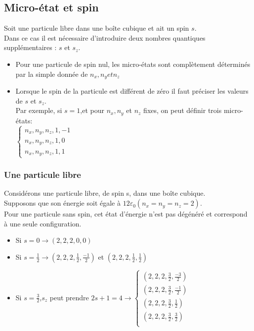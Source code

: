 \documentclass[12pt,oneside]{book}
\begin{document}
\subsection{Micro-état et spin}
Soit une particule libre dans une boîte cubique et ait un spin $s$.\\
Dans ce cas il est nécessaire d'introduire deux nombres quantiques supplémentaires : $s$ et $s_z$.
\begin{itemize}
	\item Pour une particule de spin nul, les micro-états sont complètement déterminés par la simple donnée de $n_x, n_y et n_z$
	\item Lorsque le spin de la particule est différent de zéro il faut préciser les valeurs de $s$ et $s_z$.\\
	      Par exemple, si $s= 1$,et pour $n_x,n_y$ et $n_z$ fixes, on peut définir trois micro-états:\\
	      $\begin{cases}
			      n_x,n_y,n_z,1,-1 \\
			      n_x,n_y,n_z,1,0  \\
			      n_x,n_y,n_z,1,1
		      \end{cases}$
\end{itemize}
\subsubsection{Une particule libre}
Considérons une particule libre, de spin s, dans une boîte cubique.\\
Supposons que son énergie soit égale à $12\varepsilon_0 (n_x = n_y = n_z = 2)$.\\
Pour une particule sans spin, cet état d'énergie n'est pas dégénéré et correspond à une seule configuration.
\begin{itemize}
	\item Si $s = 0 \to (2,2,2,0,0)$
	\item Si $s = \frac{1}{2} \to (2,2,2,\frac{1}{2},\frac{-1}{2})$ et $(2,2,2,\frac{1}{2},\frac{1}{2})$
	\item Si $s = \frac{3}{2}$,$s_z$ peut prendre $2s + 1 =4 \to \begin{cases}
			      \textstyle(2,2,2,\frac{3}{2},\frac{-3}{2}) \\
			      \textstyle(2,2,2,\frac{3}{2},\frac{-1}{2}) \\
			      \textstyle(2,2,2,\frac{3}{2},\frac{1}{2})  \\
			      \textstyle(2,2,2,\frac{3}{2},\frac{3}{2})  \\
		      \end{cases}$
\end{itemize}
\end{document}
